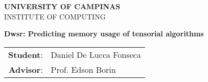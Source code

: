 \documentclass[11pt]{article}
\begin{document}


\begin{titlepage} 

    \begin{center} 
        \large \textbf{UNIVERSITY OF CAMPINAS}\\
        \large INSTITUTE OF COMPUTING\\
        
        \vspace{0.5cm}

        \begin{minipage}[tl]{31mm}
        \end{minipage}

        \vspace{0.3cm}
        \textbf{Dwsr: Predicting memory usage of tensorial algorithms}
        \vspace{0.2cm}

        \begin{tabular}{rl}
            \textbf{Student}: & Daniel De Lucca Fonseca \\
            \textbf{Advisor}: & Prof. Edson Borin \\
        \end{tabular}

    \end{center}


\end{titlepage} 

\setlength{\baselineskip}{0.1 cm}
 \pagebreak
\normalsize \tableofcontents \pagebreak
{}

\acresetall






\begin{footnotesize}
\printbibliography
\end{footnotesize}
\end{document}
